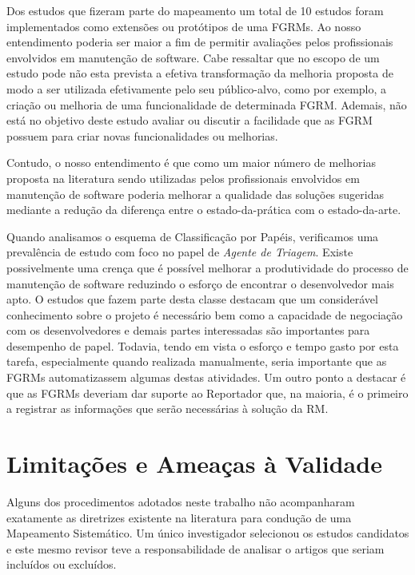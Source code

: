 Dos estudos que fizeram parte do mapeamento um total de 10 estudos foram
implementados como extensões ou protótipos de uma FGRMs. Ao nosso entendimento
poderia ser maior a fim de permitir avaliações pelos profissionais envolvidos em
manutenção de software. Cabe ressaltar que no escopo de um estudo pode não esta
prevista a efetiva transformação da melhoria proposta de modo a ser utilizada
efetivamente pelo seu público-alvo, como por exemplo, a criação ou melhoria de
uma funcionalidade de determinada FGRM\@. Ademais, não está no objetivo deste
estudo avaliar ou discutir a facilidade que as FGRM possuem para criar novas
funcionalidades ou melhorias.

Contudo, o nosso entendimento é que como um maior número de melhorias proposta
na literatura sendo utilizadas pelos profissionais envolvidos em manutenção de
software poderia melhorar a qualidade das soluções sugeridas mediante a redução
da diferença entre o estado-da-prática com o estado-da-arte.

Quando analisamos o esquema de Classificação por Papéis, verificamos uma
prevalência de estudo com foco no papel de \textit{Agente de Triagem}. Existe
possivelmente uma crença que é possível melhorar a produtividade do processo de
manutenção de software reduzindo o esforço de encontrar o desenvolvedor mais
apto. O estudos que fazem parte desta classe destacam que um considerável
conhecimento sobre o projeto é necessário bem como a capacidade de negociação
com os desenvolvedores e demais partes interessadas são importantes para
desempenho de papel. Todavia, tendo em vista o esforço e tempo gasto por esta
tarefa, especialmente quando realizada manualmente, seria importante que as
FGRMs automatizassem algumas destas atividades. Um outro ponto a destacar é que
as FGRMs deveriam dar suporte ao Reportador que, na maioria, é o primeiro a
registrar as informações que serão necessárias à solução da RM\@.

\section{Limitações e Ameaças à Validade}
\label{sec:map_limitacoes_ameacas}

Alguns dos procedimentos adotados neste trabalho não acompanharam exatamente as
diretrizes existente na literatura para condução de uma Mapeamento Sistemático.
Um único investigador selecionou os estudos candidatos e este mesmo revisor teve
a responsabilidade de analisar o artigos que seriam incluídos ou excluídos.

